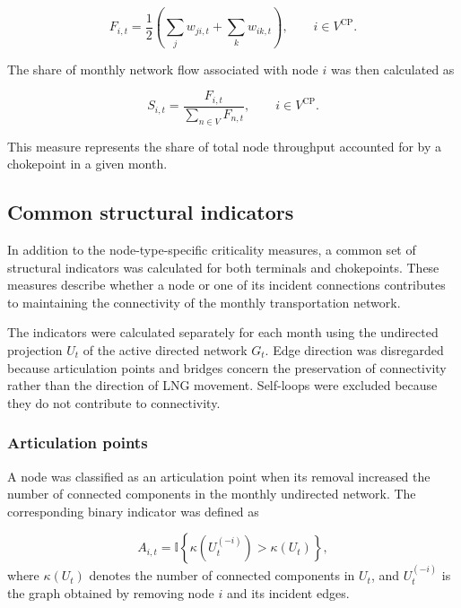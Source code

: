 \documentclass[pdftex,12pt,openright,a4paper,oneside]{book}
\begin{document}
\begin{equation}
F_{i,t}
=
\frac{1}{2}
\left(
\sum_j w_{ji,t}
+
\sum_k w_{ik,t}
\right),
\qquad
i\in V^{\mathrm{CP}}.
\label{eq:chokepoint_throughput}
\end{equation}

The share of monthly network flow associated with node \(i\) was then calculated as

\begin{equation}
S_{i,t}
=
\frac{F_{i,t}}{\displaystyle\sum_{n\in V}F_{n,t}},
\qquad i\in V^{\mathrm{CP}}.
\label{eq:monthly_flow_share}
\end{equation}

This measure represents the share of total node throughput accounted for by a chokepoint in a given month.

\subsection{Common structural indicators}
\label{subsec:structural_indicators}
In addition to the node-type-specific criticality measures, a common set of structural indicators was calculated for both terminals and chokepoints. These measures describe whether a node or one of its incident connections contributes to maintaining the connectivity of the monthly transportation network.

The indicators were calculated separately for each month using the undirected projection \(U_t\) of the active directed network \(G_t\). Edge direction was disregarded because articulation points and bridges concern the preservation of connectivity rather than the direction of LNG movement. Self-loops were excluded because they do not contribute to connectivity.

\subsubsection{Articulation points}
A node was classified as an articulation point when its removal increased the number of connected components in the monthly undirected network. The corresponding binary indicator was defined as

\begin{equation}
A_{i,t}
=
\mathbb{I}
\left\{
\kappa\left(U^{(-i)}_t\right)
>
\kappa\left(U_t\right)
\right\},
\label{eq:articulation_indicator}
\end{equation}
where \(\kappa(U_t)\) denotes the number of connected components in \(U_t\), and \(U^{(-i)}_t\) is the graph obtained by removing node \(i\) and its incident edges.
\end{document}
